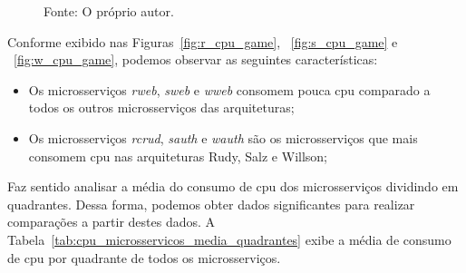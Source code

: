 \begin{figure}[htb!]
    Fonte: O próprio autor.
\end{figure}

Conforme exibido nas Figuras~\ref{fig:r_cpu_game}, ~\ref{fig:s_cpu_game} e ~\ref{fig:w_cpu_game}, podemos observar as seguintes características:

\begin{itemize}
 \item Os microsserviços \textit{rweb}, \textit{sweb} e \textit{wweb} consomem pouca \ac{cpu} comparado a todos os outros microsserviços das arquiteturas;
 \item Os microsserviços \textit{rcrud}, \textit{sauth} e \textit{wauth} são os microsserviços que mais consomem \ac{cpu} nas arquiteturas Rudy, Salz e Willson;
\end{itemize}

Faz sentido analisar a média do consumo de \ac{cpu} dos microsserviços dividindo em quadrantes.
%
Dessa forma, podemos obter dados significantes para realizar comparações a partir destes dados.
%
A Tabela~\ref{tab:cpu_microsservicos_media_quadrantes} exibe a média de consumo de \ac{cpu} por quadrante de todos os microsserviços.

